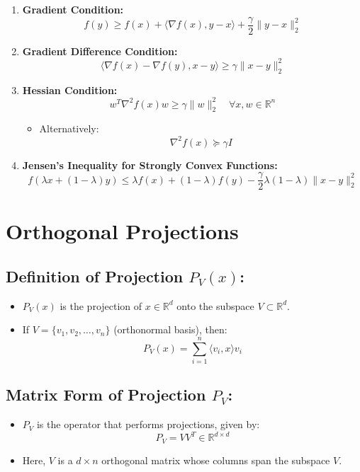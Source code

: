 \documentclass{article}
\begin{document}
\begin{enumerate}
    \item \textbf{Gradient Condition:}
    \[
    f(y) \geq f(x) + \langle \nabla f(x), y - x \rangle + \frac{\gamma}{2} \|y - x\|^2_2
    \]

    \item \textbf{Gradient Difference Condition:}
    \[
    \langle \nabla f(x) - \nabla f(y), x - y \rangle \geq \gamma \|x - y\|^2_2
    \]

    \item \textbf{Hessian Condition:}
    \[
    w^T \nabla^2 f(x) w \geq \gamma \|w\|^2_2 \quad \forall x, w \in \mathbb{R}^n
    \]
    \begin{itemize}
        \item Alternatively:
        \[
        \nabla^2 f(x) \succeq \gamma I
        \]
    \end{itemize}

    \item \textbf{Jensen's Inequality for Strongly Convex Functions:}
    \[
    f(\lambda x + (1 - \lambda) y) \leq \lambda f(x) + (1 - \lambda) f(y) - \frac{\gamma}{2} \lambda(1 - \lambda) \|x - y\|^2_2
    \]
\end{enumerate}


\section{Orthogonal Projections}

\subsection{Definition of Projection $P_V(x)$:}
\begin{itemize}
    \item $P_V (x)$ is the projection of $x \in \mathbb{R}^d$ onto the subspace $V \subset \mathbb{R}^d$.
    \item If $V = \{v_1, v_2, \ldots, v_n\}$ (orthonormal basis), then:
    \[
    P_V(x) = \sum_{i=1}^{n} \langle v_i, x \rangle v_i
    \]
\end{itemize}

\subsection{Matrix Form of Projection $P_V$:}
\begin{itemize}
    \item $P_V$ is the operator that performs projections, given by:
    \[
    P_V = V V^T \in \mathbb{R}^{d \times d}
    \]
    \item Here, $V$ is a $d \times n$ orthogonal matrix whose columns span the subspace $V$.
\end{itemize}
\end{document}
